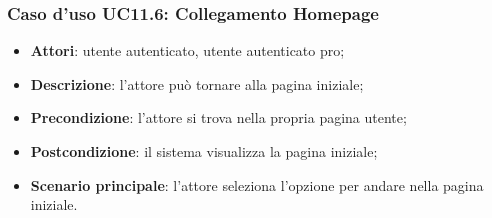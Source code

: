 \subsubsection{Caso d'uso UC11.6: Collegamento Homepage}
\begin{itemize}
\item\textbf{Attori}: utente autenticato, utente autenticato pro;
\item\textbf{Descrizione}: l'attore può tornare alla pagina iniziale;
\item\textbf{Precondizione}: l'attore si trova nella propria pagina utente;
\item\textbf{Postcondizione}: il sistema visualizza la pagina iniziale;
\item\textbf{Scenario principale}: l'attore seleziona l'opzione per andare nella pagina iniziale.
\end{itemize}